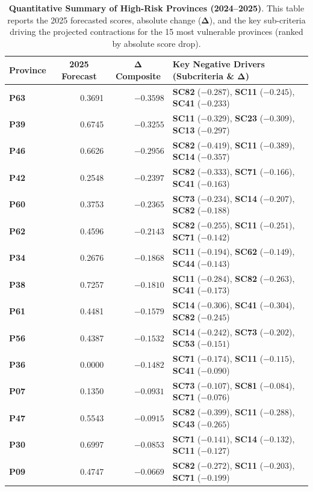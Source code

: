 \documentclass[12pt,a4paper]{article}
\begin{document}
\begin{table}[H]
\centering
\caption{\textbf{Quantitative Summary of High-Risk Provinces (2024--2025)}. This table reports the 2025 forecasted scores, absolute change ($\bm{\Delta}$), and the key sub-criteria driving the projected contractions for the 15 most vulnerable provinces (ranked by absolute score drop).}
\label{tab:high_risk_provinces}
\small
\begin{tabularx}{\textwidth}{l r r X}
\toprule
\textbf{Province} & \multicolumn{1}{c}{\textbf{2025 Forecast}} & \multicolumn{1}{c}{\textbf{$\bm{\Delta}$ Composite}} & \textbf{Key Negative Drivers (Subcriteria \& $\bm{\Delta}$)} \\
\midrule
\textbf{P63} & 0.3691 & $-0.3598$ & \textbf{SC82} ($-0.287$), \textbf{SC11} ($-0.245$), \textbf{SC41} ($-0.233$) \\
\textbf{P39} & 0.6745 & $-0.3255$ & \textbf{SC11} ($-0.329$), \textbf{SC23} ($-0.309$), \textbf{SC13} ($-0.297$) \\
\textbf{P46} & 0.6626 & $-0.2956$ & \textbf{SC82} ($-0.419$), \textbf{SC11} ($-0.389$), \textbf{SC14} ($-0.357$) \\
\textbf{P42} & 0.2548 & $-0.2397$ & \textbf{SC82} ($-0.333$), \textbf{SC71} ($-0.166$), \textbf{SC41} ($-0.163$) \\
\textbf{P60} & 0.3753 & $-0.2365$ & \textbf{SC73} ($-0.234$), \textbf{SC14} ($-0.207$), \textbf{SC82} ($-0.188$) \\
\textbf{P62} & 0.4596 & $-0.2143$ & \textbf{SC82} ($-0.255$), \textbf{SC11} ($-0.251$), \textbf{SC71} ($-0.142$) \\
\textbf{P34} & 0.2676 & $-0.1868$ & \textbf{SC11} ($-0.194$), \textbf{SC62} ($-0.149$), \textbf{SC44} ($-0.143$) \\
\textbf{P38} & 0.7257 & $-0.1810$ & \textbf{SC11} ($-0.284$), \textbf{SC82} ($-0.263$), \textbf{SC41} ($-0.173$) \\
\textbf{P61} & 0.4481 & $-0.1579$ & \textbf{SC14} ($-0.306$), \textbf{SC41} ($-0.304$), \textbf{SC82} ($-0.245$) \\
\textbf{P56} & 0.4387 & $-0.1532$ & \textbf{SC14} ($-0.242$), \textbf{SC73} ($-0.202$), \textbf{SC53} ($-0.151$) \\
\textbf{P36} & 0.0000 & $-0.1482$ & \textbf{SC71} ($-0.174$), \textbf{SC11} ($-0.115$), \textbf{SC41} ($-0.090$) \\
\textbf{P07} & 0.1350 & $-0.0931$ & \textbf{SC73} ($-0.107$), \textbf{SC81} ($-0.084$), \textbf{SC71} ($-0.076$) \\
\textbf{P47} & 0.5543 & $-0.0915$ & \textbf{SC82} ($-0.399$), \textbf{SC11} ($-0.288$), \textbf{SC43} ($-0.265$) \\
\textbf{P30} & 0.6997 & $-0.0853$ & \textbf{SC71} ($-0.141$), \textbf{SC14} ($-0.132$), \textbf{SC11} ($-0.127$) \\
\textbf{P09} & 0.4747 & $-0.0669$ & \textbf{SC82} ($-0.272$), \textbf{SC11} ($-0.203$), \textbf{SC71} ($-0.199$) \\
\bottomrule
\end{tabularx}
\end{table}

\printbibliography
\end{document}
